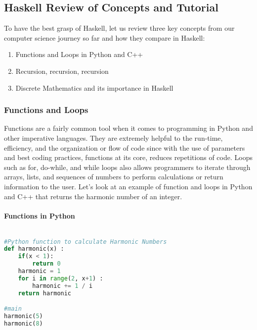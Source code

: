 \documentclass{article}
\begin{document}
\subsection{Haskell Review of Concepts and Tutorial}

To have the best grasp of Haskell, let us review three key concepts from our computer science journey so far and how they compare in Haskell:

\begin{enumerate}
    \item Functions and Loops in Python and C++
    \item Recursion, recursion, recursion
    \item Discrete Mathematics and its importance in Haskell
\end{enumerate}

\subsubsection{Functions and Loops}
Functions are a fairly common tool when it comes to programming in Python and other imperative languages. They are extremely helpful to the run-time, efficiency, and the organization or flow of code since with the use of parameters and best coding practices, functions at its core, reduces repetitions of code. Loops such as for, do-while, and while loops also allows programmers to iterate through arrays, lists, and sequences of numbers to perform calculations or return information to the user. Let's look at an example of function and loops in Python and C++ that returns the harmonic number of an integer. 

\paragraph{Functions in Python}

\begin{lstlisting}[language=Python]

#Python function to calculate Harmonic Numbers
def harmonic(x) :
    if(x < 1):
        return 0
    harmonic = 1
    for i in range(2, x+1) :
        harmonic += 1 / i
    return harmonic

#main
harmonic(5)
harmonic(8)
\end{lstlisting}
\end{document}
